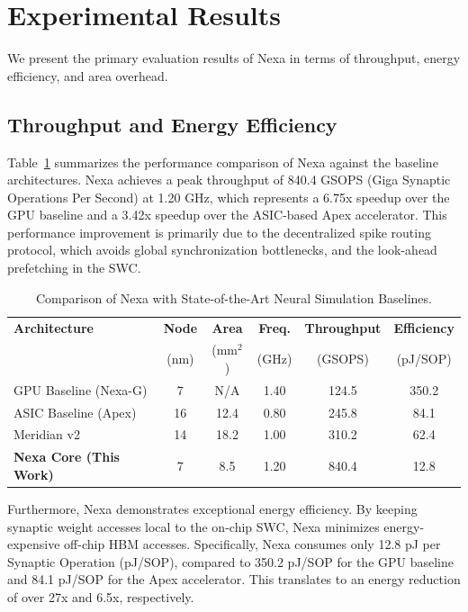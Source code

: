 \section{Experimental Results}
We present the primary evaluation results of Nexa in terms of throughput, energy efficiency, and area overhead.

\subsection{Throughput and Energy Efficiency}
Table~\ref{tab:results} summarizes the performance comparison of Nexa against the baseline architectures. Nexa achieves a peak throughput of 840.4 GSOPS (Giga Synaptic Operations Per Second) at 1.20 GHz, which represents a 6.75x speedup over the GPU baseline and a 3.42x speedup over the ASIC-based Apex accelerator. This performance improvement is primarily due to the decentralized spike routing protocol, which avoids global synchronization bottlenecks, and the look-ahead prefetching in the SWC.

\begin{table}[t]
  \centering
  \caption{Comparison of Nexa with State-of-the-Art Neural Simulation Baselines.}
  \label{tab:results}
  \begin{tabular}{lccccc}
    \toprule
    \textbf{Architecture} & \textbf{Node} & \textbf{Area} & \textbf{Freq.} & \textbf{Throughput} & \textbf{Efficiency} \\
     & (nm) & (mm$^2$) & (GHz) & (GSOPS) & (pJ/SOP) \\
    \midrule
    GPU Baseline (Nexa-G) & 7 & N/A & 1.40 & 124.5 & 350.2 \\
    ASIC Baseline (Apex) & 16 & 12.4 & 0.80 & 245.8 & 84.1 \\
    Meridian v2 & 14 & 18.2 & 1.00 & 310.2 & 62.4 \\
    \midrule
    \textbf{Nexa Core (This Work)} & 7 & 8.5 & 1.20 & 840.4 & 12.8 \\
    \bottomrule
  \end{tabular}
\end{table}

Furthermore, Nexa demonstrates exceptional energy efficiency. By keeping synaptic weight accesses local to the on-chip SWC, Nexa minimizes energy-expensive off-chip HBM accesses. Specifically, Nexa consumes only 12.8 pJ per Synaptic Operation (pJ/SOP), compared to 350.2 pJ/SOP for the GPU baseline and 84.1 pJ/SOP for the Apex accelerator. This translates to an energy reduction of over 27x and 6.5x, respectively.

